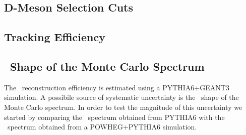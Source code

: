 \subsection{D-Meson Selection Cuts}

\subsection{Tracking Efficiency}
%
%

\subsection{\pt\ Shape of the Monte Carlo Spectrum}
The \Dstar\ reconstruction efficiency is estimated using a PYTHIA6+GEANT3 simulation.
A possibile source of systematic uncertainty is the \pt\ shape of the Monte Carlo spectrum.
In order to test the magnitude of this uncertainty we started by comparing the \pt\ spectrum obtained from PYTHIA6 with the \pt\ spectrum obtained from a POWHEG+PYTHIA6 simulation.

